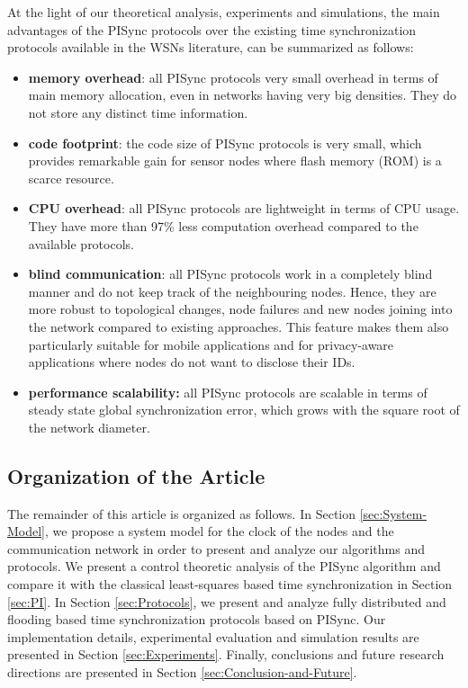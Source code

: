 \documentclass[english,a4paper,10pt,final]{article}
\numberwithin{equation}{section}
\numberwithin{figure}{section}
\begin{document}
At the light of our theoretical analysis, experiments and simulations, the main advantages of the PISync protocols over the existing time synchronization protocols available in the WSNs literature, can be summarized as follows:
\begin{itemize}
\item \textbf{memory overhead}: all PISync protocols very small overhead in terms of main memory allocation, even in networks having very big densities. They do not store any distinct time information. 
\item \textbf{code footprint}: the code size of PISync protocols is very small, which provides remarkable gain for sensor nodes where flash memory (ROM) is a scarce resource.
\item \textbf{CPU overhead}: all PISync protocols are lightweight in terms of CPU usage. They have more than 97\% less computation overhead compared to the available protocols.
\item \textbf{blind communication}: all PISync protocols work in a completely blind manner and do not keep track of the neighbouring nodes. Hence, they are more robust to topological changes, node failures and new nodes joining into the network compared to existing approaches. This feature makes them also particularly suitable for mobile applications and for privacy-aware applications where nodes do not want to disclose their IDs.
\item \textbf{performance scalability:} all PISync protocols are scalable in terms of steady state global synchronization error, which grows with the square root of the network diameter.
\end{itemize}

\subsection{Organization of the Article}

The remainder of this article is organized as follows. In Section \ref{sec:System-Model}, we propose a system model for the clock of the nodes and the communication network in order to present and analyze our algorithms and protocols. We present a control theoretic analysis of the PISync algorithm and compare it with the classical least-squares based time synchronization in Section \ref{sec:PI}. In Section \ref{sec:Protocols}, we present and analyze fully distributed and flooding based time synchronization protocols based on PISync. Our implementation details, experimental evaluation and simulation results are presented in Section \ref{sec:Experiments}. Finally, conclusions and future research directions are presented in Section \ref{sec:Conclusion-and-Future}.
\end{document}
